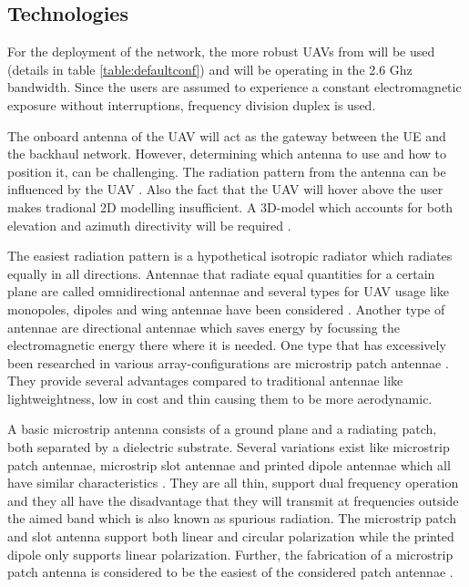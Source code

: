 \documentclass[twocolumn]{phdsymp} %
\begin{document}
\subsection{Technologies}

For the deployment of the network, the more robust \gls{UAV}s from \cite{J2} will be used (details in table \ref{table:defaultconf}) and will be operating in the 2.6 Ghz 
bandwidth. Since the users are assumed to experience a constant electromagnetic exposure without interruptions, frequency division duplex is used.

The onboard antenna of the \gls{UAV} will act as the gateway between the UE and the backhaul network.
However, determining which antenna to use and how to position it, can be challenging.
The radiation pattern from the antenna can be influenced by the \gls{UAV} \cite{A1}.
Also the fact that the \gls{UAV} will hover above the user makes tradional 2D modelling insufficient.
A 3D-model which accounts for both elevation and azimuth directivity 
will be required \cite{U12}.

The easiest radiation pattern is a hypothetical isotropic radiator which radiates equally in all directions.
Antennae that radiate equal quantities for a certain plane are called omnidirectional antennae \cite{U12} and several types 
for \gls{UAV} usage like monopoles, dipoles and wing antennae 
have been considered \cite{A4,A10,A11,A12}.
Another type of antennae are directional antennae which saves energy by focussing the electromagnetic energy there where it 
is needed. One type 
that has excessively been researched in various array-configurations are microstrip patch antennae \cite{A5,A6,A8}.
They provide several advantages compared to traditional antennae \cite{J13_microstripadvantages,J14_antennadesign}
like lightweightness, low in cost and thin causing them to be more aerodynamic. 

A basic microstrip antenna consists of a ground plane and
a radiating patch, both separated by a dielectric substrate. 
Several variations exist like microstrip patch antennae, microstrip slot antennae and printed dipole antennae which
all have similar characteristics \cite{J13_microstripadvantages, J14_antennadesign}. 
They are all thin, support dual frequency operation and they all have the disadvantage that 
they 
will transmit at frequencies outside the aimed band which is also known as
spurious radiation. The microstrip patch and slot antenna support both linear
and circular polarization while the printed dipole only supports linear polarization. 
Further, the fabrication of a microstrip patch antenna is considered to be the easiest 
of the considered patch antennae \cite{J13_microstripadvantages}. 
\end{document}
